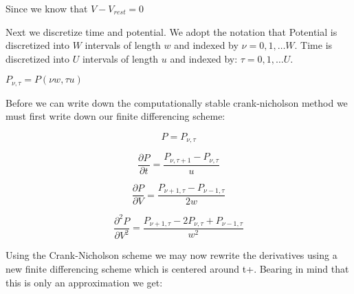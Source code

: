 \documentclass[10pt]{article}
\begin{document}
Since we know that $ V-V_{rest} = 0 $


Next we discretize time and potential. We adopt the notation that
Potential is discretized into $W$ intervals of length $w$ and indexed
by $\nu= 0,1, \dots W $.  Time is discretized  into $U$ intervals of
length $u$ and indexed by: $\tau= 0,1, \dots U $.



$P_{\nu,\tau} = P(\nu w,\tau u)$

Before we can write down the computationally stable crank-nicholson
method we must first write down our finite differencing scheme:

\begin{equation}
    P = P_{\nu,\tau}
\end{equation}

\begin{equation}
    \frac{\partial P}{\partial t} = \frac{P_{\nu,\tau +1 } -
    P_{\nu,\tau}}{u}
\end{equation}

\begin{equation}
    \frac{\partial P}{\partial V} = 
    \frac{P_{\nu +1,\tau } -
    P_{\nu - 1,\tau } }
    {2w}
\end{equation}

\begin{equation}
    \frac{\partial^2 P}{\partial V^2} = 
    \frac{P_{\nu+1,\tau} - 2 P_{\nu,\tau} + P_{\nu-1,\tau}}
    {w^2}
\end{equation}


Using the Crank-Nicholson scheme we  may now rewrite the derivatives
using a new finite differencing scheme which is centered around t+. Bearing in mind that this is only
an approximation we get:

\end{document}
